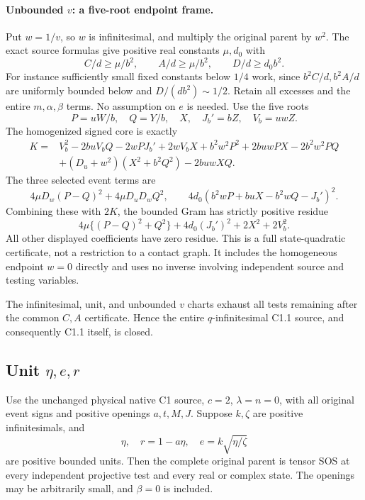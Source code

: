 \paragraph{Unbounded $v$: a five-root endpoint frame.}
Put $w=1/v$, so $w$ is infinitesimal, and multiply the original
parent by $w^2$. The exact source formulas give positive real
constants $\mu,d_0$ with
\[
 C/d\ge\mu/b^2,\qquad A/d\ge\mu/b^2,\qquad
 D/d\ge d_0 b^2.
\]
For instance sufficiently small fixed constants below $1/4$ work,
since $b^2C/d,b^2A/d$ are uniformly bounded below and
$D/(db^2)\sim1/2$. Retain all excesses and the entire $m,\alpha,
\beta$ terms. No assumption on $e$ is needed.
Use the five roots
\[
              P=uW/b,\quad Q=Y/b,\quad X,\quad J_b'=bZ,
                     \quad V_b=uwZ.
\]
The homogenized signed core is exactly
\begin{align*}
 K={}&V_b^2-2buV_bQ-2wPJ_b'+2wV_bX+b^2w^2P^2
       +2buwPX-2b^2w^2PQ\\
 &+(D_u+w^2)(X^2+b^2Q^2)-2buwXQ.
 \tag{QR2}
\end{align*}
The three selected event terms are
\[
 4\mu D_w(P-Q)^2+4\mu D_uD_wQ^2,
 \qquad
 4d_0(b^2wP+buX-b^2wQ-J_b')^2.
 \tag{QR3}
\]
Combining these with $2K$, the bounded Gram has strictly positive
residue
\[
 4\mu\{(P-Q)^2+Q^2\}+4d_0(J_b')^2+2X^2+2V_b^2.
\]
All other displayed coefficients have zero residue. This is a full
state-quadratic certificate, not a restriction to a contact graph.
It includes the homogeneous endpoint $w=0$ directly and uses no
inverse involving independent source and testing variables.

The infinitesimal, unit, and unbounded $v$ charts exhaust all tests
remaining after the common $C,A$ certificate. Hence the entire
$q$-infinitesimal C1.1 source, and consequently C1.1 itself, is closed.



\subsection{Unit $\eta,e,r$}

\label{component:p69995d829bb2}

\begin{theorem}
Use the unchanged physical native C1 source, $c=2$, $\lambda=n=0$,
with all original event signs and positive openings $a,t,M,J$.
Suppose $k,\zeta$ are positive infinitesimals, and
\[
 \eta,\quad r=1-a\eta,\quad e=k\sqrt{\eta/\zeta}
\]
are positive bounded units. Then the complete original parent is tensor
SOS at every independent projective test and every real or complex state.
The openings may be arbitrarily small, and $\beta=0$ is included.
\end{theorem}

